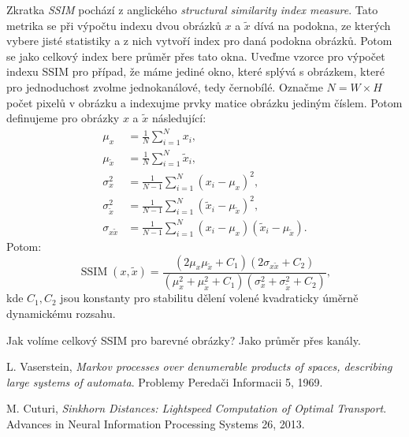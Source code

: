 \documentclass[czech]{article}
\begin{document}
Zkratka \emph{SSIM} pochází z anglického \emph{structural similarity index measure}.
Tato metrika se při výpočtu indexu dvou obrázků $x$ a $\tilde{x}$ dívá na podokna,
ze kterých vybere jisté statistiky a z nich vytvoří index pro daná podokna obrázků.
Potom se jako celkový index bere průměr přes tato okna.
Uveďme vzorce pro výpočet indexu SSIM pro případ, že máme jediné okno, které splývá s obrázkem,
které pro jednoduchost zvolme jednokanálové, tedy černobílé.
Označme $N = W \times H$ počet pixelů v obrázku a indexujme prvky matice obrázku jediným číslem.
Potom definujeme pro obrázky $x$ a $\tilde{x}$ následující:
\begin{align*}
    \mu_x &= \frac{1}{N} \sum_{i = 1}^N x_i, \\
    \mu_{\tilde{x}} &= \frac{1}{N} \sum_{i = 1}^N \tilde{x}_i, \\
    \sigma_x^2 &= \frac{1}{N - 1} \sum_{i = 1}^N (x_i - \mu_x)^2, \\
    \sigma_{\tilde{x}}^2 &= \frac{1}{N - 1} \sum_{i = 1}^N (\tilde{x}_i - \mu_{\tilde{x}})^2, \\
    \sigma_{x \tilde{x}} &= \frac{1}{N - 1} \sum_{i = 1}^N (x_i - \mu_x)(\tilde{x}_i - \mu_{\tilde{x}}).
\end{align*}
Potom:
\begin{equation}
    \operatorname{SSIM}(x, \tilde{x}) = \frac{(2 \mu_x \mu_{\tilde{x}} + C_1)(2 \sigma_{x \tilde{x}} + C_2)}{(\mu_x^2 + \mu_{\tilde{x}}^2 + C_1)(\sigma_x^2 + \sigma_{\tilde{x}}^2 + C_2)},
\end{equation}
kde $C_1, C_2$ jsou konstanty pro stabilitu dělení volené kvadraticky úměrně dynamickému rozsahu.


Jak volíme celkový SSIM pro barevné obrázky?
Jako průměr přes kanály.

\begin{thebibliography}{1}

 L. Vaserstein,
\emph{Markov processes over denumerable products of spaces, describing large systems of automata}.
Problemy Peredači Informacii 5, 1969.

 M. Cuturi,
\emph{Sinkhorn Distances: Lightspeed Computation of Optimal Transport}.
Advances in Neural Information Processing Systems 26, 2013.

\end{thebibliography}
\end{document}
